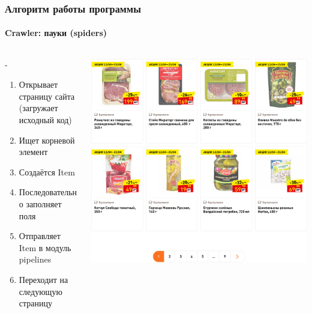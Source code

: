 \documentclass{beamer}
\newlength{\mylen}
\begin{document}
\begin{frame}
    \frametitle{Алгоритм работы программы}
    \framesubtitle{Crawler: пауки (spiders)}
    \begin{columns}
        \setlength{\mylen}{0.7\textwidth}
        \begin{column}{\dimexpr\textwidth-\mylen}
            \begin{scriptsize}
            \begin{enumerate}
                \item Открывает страницу сайта (загружает исходный код)
                \item Ищет корневой элемент
                \item Создаётся Item
                \item Последовательно заполняет поля
                \item Отправляет Item в модуль pipelines
                \item Переходит на следующую страницу
            \end{enumerate}
            \end{scriptsize}
        \end{column}
        \begin{column}{\mylen}
            \includegraphics[width=0.9\columnwidth]{dixy_example.png}
        \end{column}
    \end{columns}
\end{frame}
\end{document}
